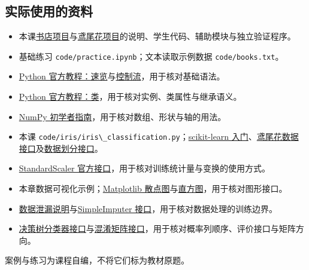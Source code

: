 \documentclass[UTF8,a4paper,11pt,fontset=fandol]{ctexart}
\providecommand{\tightlist}{\setlength{\itemsep}{0pt}\setlength{\parskip}{0pt}}
\providecommand{\passthrough}[1]{#1}
\begin{document}
\subsection{实际使用的资料}\label{ux5b9eux9645ux4f7fux7528ux7684ux8d44ux6599}

\begin{itemize}
\tightlist
\item
  本课\href{code/bookstore/README.md}{书店项目}与\href{code/iris/README.md}{鸢尾花项目}的说明、学生代码、辅助模块与独立验证程序。
\item
  基础练习 \passthrough{\lstinline!code/practice.ipynb!}；文本读取示例数据 \passthrough{\lstinline!code/books.txt!}。
\item
  \href{https://docs.python.org/zh-cn/3.11/tutorial/introduction.html}{Python 官方教程：速览}与\href{https://docs.python.org/zh-cn/3.11/tutorial/controlflow.html}{控制流}，用于核对基础语法。
\item
  \href{https://docs.python.org/3.11/tutorial/classes.html}{Python 官方教程：类}，用于核对实例、类属性与继承语义。
\item
  \href{https://numpy.org/doc/stable/user/absolute_beginners.html}{NumPy 初学者指南}，用于核对数组、形状与轴的用法。
\item
  本课 \passthrough{\lstinline!code/iris/iris\_classification.py!}；\href{https://scikit-learn.org/stable/getting_started.html}{scikit-learn 入门}、\href{https://scikit-learn.org/stable/modules/generated/sklearn.datasets.load_iris.html}{鸢尾花数据接口}及\href{https://scikit-learn.org/stable/modules/generated/sklearn.model_selection.train_test_split.html}{数据划分接口}。
\item
  \href{https://scikit-learn.org/stable/modules/generated/sklearn.preprocessing.StandardScaler.html}{StandardScaler 官方接口}，用于核对训练统计量与变换的使用方式。
\item
  本章数据可视化示例；\href{https://matplotlib.org/stable/api/_as_gen/matplotlib.pyplot.scatter.html}{Matplotlib 散点图}与\href{https://matplotlib.org/stable/api/_as_gen/matplotlib.pyplot.hist.html}{直方图}，用于核对图形接口。
\item
  \href{https://scikit-learn.org/stable/common_pitfalls.html}{数据泄漏说明}与\href{https://scikit-learn.org/stable/modules/generated/sklearn.impute.SimpleImputer.html}{SimpleImputer 接口}，用于核对数据处理的训练边界。
\item
  \href{https://scikit-learn.org/stable/modules/generated/sklearn.tree.DecisionTreeClassifier.html}{决策树分类器接口}与\href{https://scikit-learn.org/stable/modules/generated/sklearn.metrics.confusion_matrix.html}{混淆矩阵接口}，用于核对概率列顺序、评价接口与矩阵方向。
\end{itemize}

案例与练习为课程自编，不将它们标为教材原题。

\end{document}
